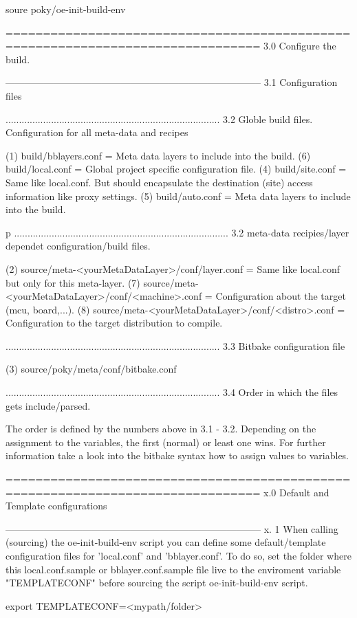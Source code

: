     soure poky/oe-init-build-env





================================================================================
3.0 Configure the build.

--------------------------------------------------------------------------------
3.1 Configuration files

................................................................................
3.2 Globle build files. Configuration for all meta-data and recipes

 (1) build/bblayers.conf    = Meta data layers to include into the build.
 (6) build/local.conf       = Global project specific configuration file.
 (4) build/site.conf        = Same like local.conf. But should encapsulate
                                the destination (site) access information like
                                proxy settings.
 (5) build/auto.conf        = Meta data layers to include into the build.

 p
................................................................................
3.2 meta-data recipies/layer dependet configuration/build files. 

 (2) source/meta-<yourMetaDataLayer>/conf/layer.conf     =
            Same like local.conf but only for this meta-layer.
 (7) source/meta-<yourMetaDataLayer>/conf/<machine>.conf =
            Configuration about the target (mcu, board,...).
 (8) source/meta-<yourMetaDataLayer>/conf/<distro>.conf  =
            Configuration to the target distribution to compile.

................................................................................
3.3 Bitbake configuration file

 (3) source/poky/meta/conf/bitbake.conf

................................................................................
3.4 Order in which the files gets include/parsed.

    The order is defined by the numbers above in 3.1 - 3.2. Depending on the
    assignment to the variables, the first (normal) or least one wins. For
    further information take a look into the bitbake syntax how to assign
    values to variables.








================================================================================
x.0 Default and Template configurations

--------------------------------------------------------------------------------
x. 1 When calling (sourcing) the oe-init-build-env script you can define some
    default/template configuration files for 'local.conf' and 'bblayer.conf'.
    To do so, set the folder where this local.conf.sample or bblayer.conf.sample
    file live to the enviroment variable "TEMPLATECONF" before sourcing the
    script oe-init-build-env script.

    export TEMPLATECONF=<mypath/folder>


